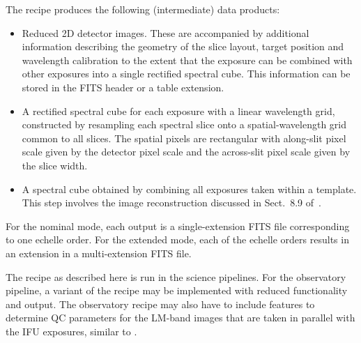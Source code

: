 The recipe produces the following (intermediate) data products:
\begin{itemize}\item Reduced 2D detector images. These are accompanied by additional
  information describing the geometry of the slice layout, target
  position and wavelength calibration to the extent that the exposure can be
  combined with other exposures into a single rectified spectral cube.
  This information can be stored in the FITS header or a table
  extension.
\item A rectified spectral cube for each exposure with a linear
  wavelength grid, constructed by resampling each spectral slice onto
  a spatial-wavelength grid common to all slices. The spatial pixels
  are rectangular with along-slit pixel scale given by the detector
  pixel scale and the across-slit pixel scale given by the slice
  width.
\item A spectral cube obtained by combining all exposures taken within
  a template. This step involves the image reconstruction discussed in
  Sect.~8.9 of~\cite{DRLS}.
\end{itemize}

For the nominal mode, each output is a single-extension FITS file
corresponding to one echelle order. For the extended mode, each of the
echelle orders results in an extension in a multi-extension FITS
file.

The recipe as described here is run in the science pipelines. For the
observatory pipeline, a variant of the recipe may be implemented with
reduced functionality and output. The observatory recipe may also have
to include features to determine QC parameters for the LM-band images
that are taken in parallel with the IFU exposures, similar to
 .

